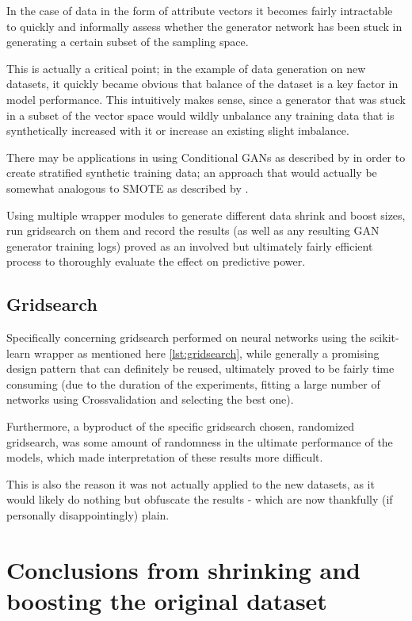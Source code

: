 In the case of data in the form of attribute vectors it becomes fairly intractable to quickly and informally assess whether the generator network has been stuck in generating a certain subset of the sampling space.

This is actually a critical point; in the example of data generation on new datasets, it quickly became obvious that balance of the dataset is a key factor in model performance. This intuitively makes sense, since a generator that was stuck in a subset of the vector space would wildly unbalance any training data that is synthetically increased with it or increase an existing slight imbalance.

There may be applications in using Conditional \acp{GAN} as described by \cite{conditional_gans} in order to create stratified synthetic training data; an approach that would actually be somewhat analogous to \ac{SMOTE} as described by \cite{smote}.

Using multiple wrapper modules to generate different data shrink and boost sizes, run gridsearch on them and record the results (as well as any resulting \ac{GAN} generator training logs) proved as an involved but ultimately fairly efficient process to thoroughly evaluate the effect on predictive power.

\pagebreak

\subsection{Gridsearch}

Specifically concerning gridsearch performed on neural networks using the scikit-learn wrapper as mentioned here \ref{lst:gridsearch}, while generally a promising design pattern that can definitely be reused, ultimately proved to be fairly time consuming (due to the duration of the experiments, fitting a large number of networks using Crossvalidation and selecting the best one). 

Furthermore, a byproduct of the specific gridsearch chosen, randomized gridsearch, was some amount of randomness in the ultimate performance of the models, which made interpretation of these results more difficult. 

This is also the reason it was not actually applied to the new datasets, as it would likely do nothing but obfuscate the results - which are now thankfully (if personally disappointingly) plain.

\pagebreak

\section{Conclusions from shrinking and boosting the original dataset}

